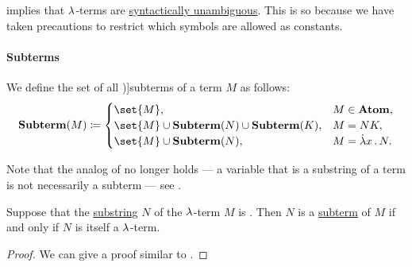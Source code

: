 \begin{remark}\label{rem:binders_and_syntactic_ambiguity}
   implies that \( {\mathrm \lambda} \)-terms are \hyperref[def:grammar_ambiguity]{syntactically unambiguous}. This is so because we have taken precautions to restrict which symbols are allowed as constants.
\end{remark}

\paragraph{Subterms}

\begin{definition}\label{def:lambda_subterm}
  We define the set of all \term[ru=подтерм (\cite[189]{Герасимов2011Вычислимость})]{subterms} of a term \( M \) as follows:
  \begin{equation*}
    \op*{Subterm}(M) \coloneqq \begin{cases}
      \set{ M },                                             &M \in \op*{Atom}, \\
      \set{ M } \cup \op*{Subterm}(N) \cup \op*{Subterm}(K), &M = N K, \\
      \set{ M } \cup \op*{Subterm}(N),                       &M = \qabs x N.
    \end{cases}
  \end{equation*}
\end{definition}
\begin{comments}
  \item Note that the analog of  no longer holds --- a variable that is a substring of a term is not necessarily a subterm --- see .
\end{comments}

\begin{proposition}\label{thm:lambda_subterm_characterization}
  Suppose that the \hyperref[def:formal_language/substring]{substring} \( N \) of the \( {\mathrm \lambda} \)-term \( M \) is . Then \( N \) is a \hyperref[def:lambda_subterm]{subterm} of \( M \) if and only if \( N \) is itself a \( {\mathrm \lambda} \)-term.
\end{proposition}
\begin{proof}
  We can give a proof similar to .
\end{proof}

